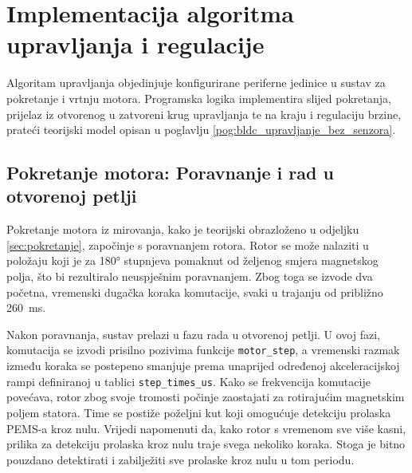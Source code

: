 \documentclass[diplomskirad]{fer}
\begin{document}

\section{Implementacija algoritma upravljanja i regulacije}
\label{sec:implementacija_algoritma_i_regulacije}

Algoritam upravljanja objedinjuje konfigurirane periferne jedinice u sustav za
pokretanje i vrtnju motora. Programska logika implementira slijed pokretanja,
prijelaz iz otvorenog u zatvoreni krug upravljanja te na kraju i regulaciju
brzine, prateći teorijski model opisan u poglavlju
\ref{pog:bldc_upravljanje_bez_senzora}.

\subsection{Pokretanje motora: Poravnanje i rad u otvorenoj petlji}
\label{ssec:pokretanje_motora}

Pokretanje motora iz mirovanja, kako je teorijski obrazloženo u odjeljku
\ref{sec:pokretanje}, započinje s poravnanjem rotora. Rotor se može nalaziti u
položaju koji je za \ang{180} stupnjeva pomaknut od željenog smjera magnetskog
polja, što bi rezultiralo neuspješnim poravnanjem. Zbog toga se izvode dva
početna, vremenski dugačka koraka komutacije, svaki u trajanju od približno
\SI{260}{\milli\second}.

Nakon poravnanja, sustav prelazi u fazu rada u otvorenoj petlji. U ovoj fazi,
komutacija se izvodi prisilno pozivima funkcije \texttt{motor\_step}, a
vremenski razmak između koraka se postepeno smanjuje prema unaprijed određenoj
akceleracijskoj rampi definiranoj u tablici \texttt{step\_times\_us}. Kako se
frekvencija komutacije povećava, rotor zbog svoje tromosti počinje zaostajati
za rotirajućim magnetskim poljem statora. Time se postiže poželjni kut koji
omogućuje detekciju prolaska PEMS-a kroz nulu. Vrijedi napomenuti da, kako
rotor s vremenom sve više kasni, prilika za detekciju prolaska kroz nulu traje
svega nekoliko koraka. Stoga je bitno pouzdano detektirati i zabilježiti sve
prolaske kroz nulu u tom periodu.

\end{document}
